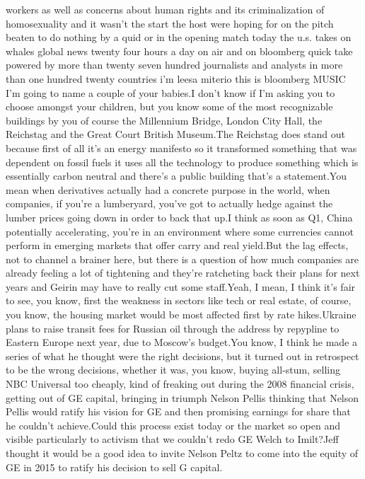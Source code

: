 \documentclass{article}%
\begin{document}
workers as well as concerns about human rights and its criminalization of homosexuality and it wasn't the start the host were hoping for on the pitch beaten to do nothing by a quid or in the opening match today the u.s. takes on whales global news twenty four hours a day on air and on bloomberg quick take powered by more than twenty seven hundred journalists and analysts in more than one hundred twenty countries i'm leesa miterio this is bloomberg  MUSIC I'm going to name a couple of your babies.I don't know if I'm asking you to choose amongst your children, but you know some of the most recognizable buildings by you of course the Millennium Bridge, London City Hall, the Reichstag and the Great Court British Museum.The Reichstag does stand out because first of all it's an energy manifesto so it transformed something that was dependent on fossil fuels it uses all the technology to produce something which is essentially carbon neutral and there's a public building that's a statement.You mean when derivatives actually had a concrete purpose in the world, when companies, if you're a lumberyard, you've got to actually hedge against the lumber prices going down in order to back that up.I think as soon as Q1, China potentially accelerating, you're in an environment where some currencies cannot perform in emerging markets that offer carry and real yield.But the lag effects, not to channel a brainer here, but there is a question of how much companies are already feeling a lot of tightening and they're ratcheting back their plans for next years and Geirin may have to really cut some staff.Yeah, I mean, I think it's fair to see, you know, first the weakness in sectors like tech or real estate, of course, you know, the housing market would be most affected first by rate hikes.Ukraine plans to raise transit fees for Russian oil through the address by repypline to Eastern Europe next year, due to Moscow's budget.You know, I think he made a series of what he thought were the right decisions, but it turned out in retrospect to be the wrong decisions, whether it was, you know, buying all{-}stum, selling NBC Universal too cheaply, kind of freaking out during the 2008 financial crisis, getting out of GE capital, bringing in triumph Nelson Pellis thinking that Nelson Pellis would ratify his vision for GE and then promising earnings for share that he couldn't achieve.Could this process exist today or the market so open and visible particularly to activism that we couldn't redo GE Welch to Imilt?Jeff thought it would be a good idea to invite Nelson Peltz to come into the equity of GE in 2015 to ratify his decision to sell G capital.%
\end{document}
